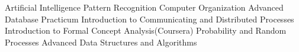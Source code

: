 \begin{cvhonors}
  \cvhonor
      {Artificial Intelligence}
    {}
    {}
    {}
      \cvhonor
      {Pattern Recognition}
    {}
    {}
    {}
  \cvhonor
      {Computer Organization}
    {}
    {}
    {}
  \cvhonor
      {Advanced Database Practicum}
    {}
    {}
    {}
  \cvhonor
      {Introduction to Communicating and Distributed Processes}
    {}
    {}
    {}
  \cvhonor
      {Introduction to Formal Concept Analysis(Coursera)}
    {}
    {}
    {}
      \cvhonor
      {Probability and Random Processes}
    {}
    {}
    {}
          \cvhonor
      {Advanced Data Structures and Algorithms }
    {}
    {}
    {}

\end{cvhonors}
